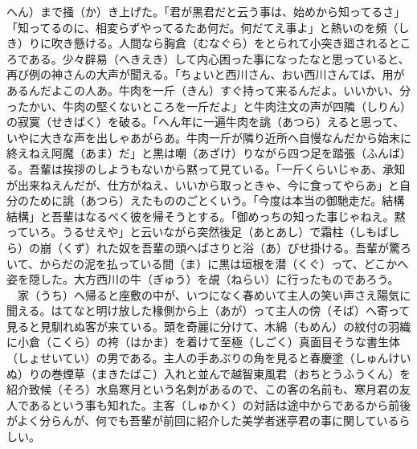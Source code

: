 へん）まで掻（か）き上げた。「君が黒君だと云う事は、始めから知ってるさ」「知ってるのに、相変らずやってるたあ何だ。何だてえ事よ」と熱いのを頻（しき）りに吹き懸ける。人間なら胸倉（むなぐら）をとられて小突き廻されるところである。少々辟易（へきえき）して内心困った事になったなと思っていると、再び例の神さんの大声が聞える。「ちょいと西川さん、おい西川さんてば、用があるんだよこの人あ。牛肉を一斤（きん）すぐ持って来るんだよ。いいかい、分ったかい、牛肉の堅くないところを一斤だよ」と牛肉注文の声が四隣（しりん）の寂寞（せきばく）を破る。「へん年に一遍牛肉を誂（あつら）えると思って、いやに大きな声を出しゃあがらあ。牛肉一斤が隣り近所へ自慢なんだから始末に終えねえ阿魔（あま）だ」と黒は嘲（あざけ）りながら四つ足を踏張（ふんば）る。吾輩は挨拶のしようもないから黙って見ている。「一斤くらいじゃあ、承知が出来ねえんだが、仕方がねえ、いいから取っときゃ、今に食ってやらあ」と自分のために誂（あつら）えたもののごとくいう。「今度は本当の御馳走だ。結構結構」と吾輩はなるべく彼を帰そうとする。「御めっちの知った事じゃねえ。黙っていろ。うるせえや」と云いながら突然後足（あとあし）で霜柱（しもばしら）の崩（くず）れた奴を吾輩の頭へばさりと浴（あ）びせ掛ける。吾輩が驚ろいて、からだの泥を払っている間（ま）に黒は垣根を潜（くぐ）って、どこかへ姿を隠した。大方西川の牛（ぎゅう）を覘（ねらい）に行ったものであろう。\\
　家（うち）へ帰ると座敷の中が、いつになく春めいて主人の笑い声さえ陽気に聞える。はてなと明け放した椽側から上（あが）って主人の傍（そば）へ寄って見ると見馴れぬ客が来ている。頭を奇麗に分けて、木綿（もめん）の紋付の羽織に小倉（こくら）の袴（はかま）を着けて至極（しごく）真面目そうな書生体（しょせいてい）の男である。主人の手あぶりの角を見ると春慶塗（しゅんけいぬ）りの巻煙草（まきたばこ）入れと並んで越智東風君（おちとうふうくん）を紹介致候（そろ）水島寒月という名刺があるので、この客の名前も、寒月君の友人であるという事も知れた。主客（しゅかく）の対話は途中からであるから前後がよく分らんが、何でも吾輩が前回に紹介した美学者迷亭君の事に関しているらしい。\\
